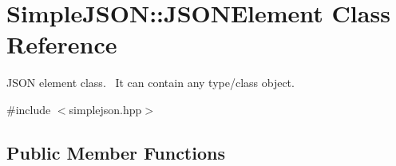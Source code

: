 \hypertarget{class_simple_j_s_o_n_1_1_j_s_o_n_element}{\section{Simple\+J\+S\+O\+N\+:\+:J\+S\+O\+N\+Element Class Reference}
\label{class_simple_j_s_o_n_1_1_j_s_o_n_element}
}


J\+S\+O\+N element class.~\newline
 It can contain any type/class object.  




{\ttfamily \#include $<$simplejson.\+hpp$>$}

\subsection*{Public Member Functions}
